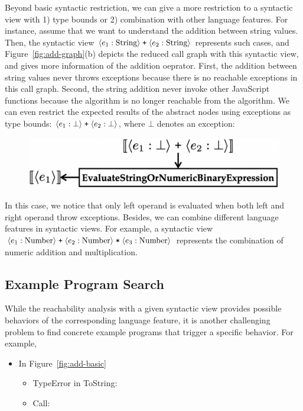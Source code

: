 Beyond basic syntactic restriction, we can give a more restriction to a
syntactic view with 1) type bounds or 2) combination with other language
features.  For instance, assume that we want to understand the addition between
string values.  Then, the syntactic view $\langle e_1: \text{String} \rangle \;
\texttt{+} \; \langle e_2: \text{String} \rangle$ represents such cases, and
Figure~\ref{fig:add-graph}(b) depicts the reduced call graph with this syntactic
view, and gives more information of the addition oeprator.  First, the addition
between string values never throws exceptions because there is no reachable
exceptions in this call graph.  Second, the string addition never invoke other
JavaScript functions because the  algorithm is no longer reachable
from the  algorithm.  We can even restrict the expected
results of the abstract nodes using exceptions as type bounds: $\langle e_1:
\bot \rangle \; \texttt{+} \; \langle e_2: \bot \rangle$, where $\bot$ denotes an exception:
\begin{figure}[H]
  \centering
  \includegraphics[width=.7\columnwidth]{img/add-exc.png}
\end{figure} \noindent
In this case, we notice that only left operand is evaluated when both left and
right operand throw exceptions.  Besides, we can combine different language
features in syntactic views.  For example, a syntactic view $\langle e_1:
\text{Number} \rangle \; \texttt{+} \; \langle e_2: \text{Number} \rangle \; \texttt{*} \;
\langle e_3: \text{Number} \rangle$ represents the combination of numeric addition
and multiplication.





\subsection{Example Program Search}\label{sec:reduce-spec}

While the reachability analysis with a given syntactic view provides possible
behaviors of the corresponding language feature, it is another challenging
problem to find concrete example programs that trigger a specific behavior.  For
example,


\begin{itemize}
  \item In Figure~\ref{fig:add-basic}
    \begin{itemize}
      \item TypeError in ToString:
      \item Call:
    \end{itemize}
\end{itemize}
